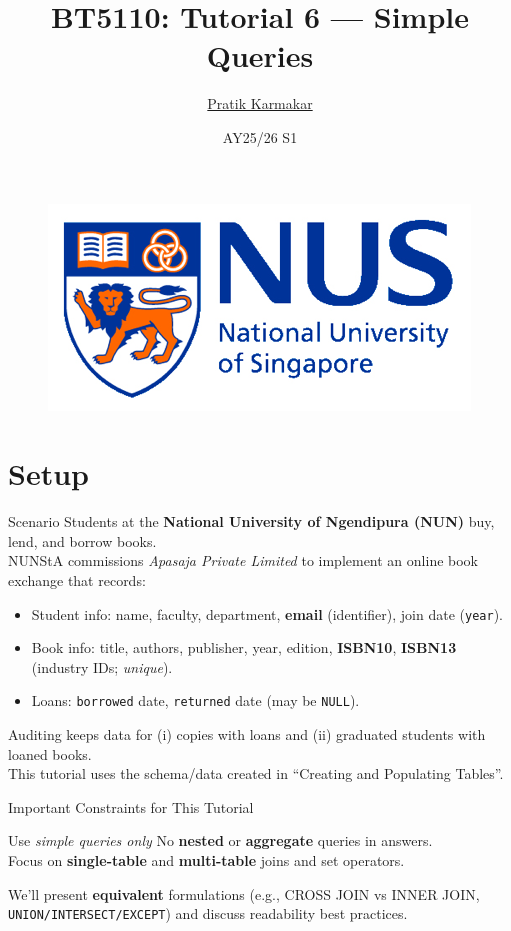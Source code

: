 \documentclass{beamer}
\author{\href{https://pratik2358.github.io/}{Pratik Karmakar}}
\title{BT5110: Tutorial 6 — Simple Queries}
\institute{
  School of Computing,\\
  National University of Singapore
}
\date{AY25/26 S1}
\begin{document}
\begin{frame}
  \titlepage
  \begin{figure}[htpb]
    \begin{center}
      \includegraphics[keepaspectratio, scale=0.18]{nus-logo.png} %
    \end{center}
  \end{figure}
\end{frame}
\section{Setup}
\begin{frame}{Scenario}
\small
Students at the \textbf{National University of Ngendipura (NUN)} buy, lend, and borrow books.\\
NUNStA commissions \emph{Apasaja Private Limited} to implement an online book exchange that records:
\begin{itemize}\itemsep3pt
  \item Student info: name, faculty, department, \textbf{email} (identifier), join date (\texttt{year}).
  \item Book info: title, authors, publisher, year, edition, \textbf{ISBN10}, \textbf{ISBN13} (industry IDs; \emph{unique}).
  \item Loans: \texttt{borrowed} date, \texttt{returned} date (may be \texttt{NULL}).
\end{itemize}
Auditing keeps data for (i) copies with loans and (ii) graduated students with loaned books. \\
This tutorial uses the schema/data created in “Creating and Populating Tables”.
\end{frame}

\begin{frame}{Important Constraints for This Tutorial}
\Large
\begin{block}{Use \emph{simple queries only}}
No \textbf{nested} or \textbf{aggregate} queries in answers. \\
Focus on \textbf{single-table} and \textbf{multi-table} joins and set operators.
\end{block}
\normalsize
We’ll present \textbf{equivalent} formulations (e.g., CROSS JOIN vs INNER JOIN, \texttt{UNION/INTERSECT/EXCEPT}) and discuss readability best practices.
\end{frame}
\end{document}
